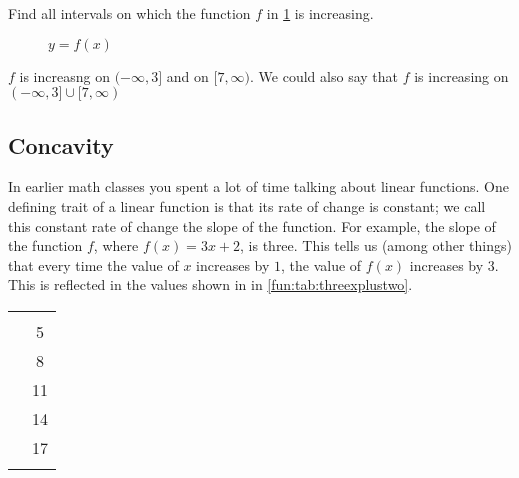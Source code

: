 \begin{doyouunderstand}
	\begin{problem}
	Find all intervals on which the function $f$ in \cref{fun:fig:increasingIntervals} is increasing.
		\begin{figure}[!htb]
		\centering
		\caption{$y=f(x)$}
		\label{fun:fig:increasingIntervals}
	\end{figure}%
	\begin{shortsolution}
		$f$ is increasng on $(-\infty,3]$ and on $[7,\infty)$. We could also say that $f$ is increasing on $(-\infty,3]\cup[7,\infty)$
	\end{shortsolution}
	\end{problem}
\end{doyouunderstand}
	
	
\subsection{Concavity}
In earlier math classes you spent a lot of time talking about linear functions.  
One defining trait of a linear function is that its rate of change is constant; 
we call this constant rate of change the slope of the function.  For example, the 
slope of the function $f$, where $f(x)=3x+2$, is three.  This tells us (among other things) 
that every time the value of $x$ increases by $1$, the value of $f(x)$  increases by $3$.  
This is reflected in the values shown in in \cref{fun:tab:threexplustwo}.
\begin{margintable}
	\centering
	 \label{fun:tab:threexplustwo}
	\begin{tabular}{S[table-format=1.0]S[table-format=2.0]}
		\beforeheading
		 &  \\             & 5                \\             & 8                \\             & 11               \\             & 14               \\             & 17               \\\lastline
	\end{tabular}
\end{margintable}

